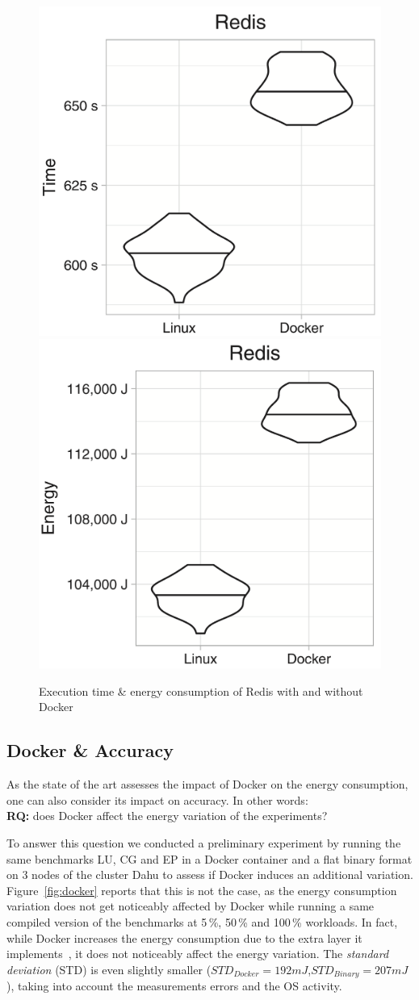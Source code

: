 \begin{figure}
    \includegraphics[width=.5\linewidth]{imgs/docker_vs_vm_energy_paper/reddis_time}
    \includegraphics[width=.5\linewidth]{imgs/docker_vs_vm_energy_paper/reddis_energy}
    \caption{Execution time \& energy consumption of Redis with and without Docker~\cite{santos2018does}}\label{fig:docker_reddis}
\end{figure}


\subsection{Docker \& Accuracy}
As the state of the art assesses the impact of Docker on the energy consumption, one can also consider its impact on accuracy.
In other words:\\
\textbf{RQ:} does Docker affect the energy variation of the experiments? %

To answer this question we conducted a preliminary experiment by running the same benchmarks \textsf{LU}, \textsf{CG} and \textsf{EP} in a Docker container and a flat binary format on 3 nodes of the cluster \textsf{Dahu} to assess if Docker induces an additional variation.
Figure~\ref{fig:docker} reports that this is not the case, as the energy consumption variation does not get noticeably affected by Docker while running a same compiled version of the benchmarks at 5\,\%, 50\,\% and 100\,\% workloads.
In fact, while Docker increases the energy consumption due to the extra layer it implements~\cite{eddie_antonio_santos_how}, it does not noticeably affect the energy variation.
The \emph{standard deviation} (STD) is even slightly smaller ($STD_{Docker}=192 mJ$,$STD_{Binary}=207 mJ$), taking into account the measurements errors and the OS activity.

